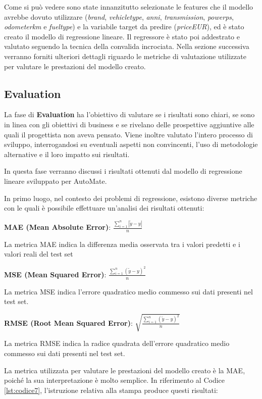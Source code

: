 Come si può vedere sono state innanzitutto selezionate le features che il modello avrebbe dovuto utilizzare (\textit{brand}, \mbox{\textit{vehicle\textunderscore type}}, \textit{anni}, \textit{transmission}, \mbox{\textit{power\textunderscore ps}}, \mbox{\textit{odometer\textunderscore km}} e \textit{fuel\textunderscore type}) e la variabile target da predire \mbox{(\textit{price\textunderscore EUR})}, ed è stato creato il modello di regressione lineare. Il regressore è stato poi addestrato e valutato seguendo la tecnica della convalida incrociata. Nella sezione successiva verranno forniti ulteriori dettagli riguardo le metriche di valutazione utilizzate per valutare le prestazioni del modello creato.
\pagebreak

\subsection{Evaluation}
La fase di \textbf{Evaluation} ha l'obiettivo di valutare se i risultati sono chiari, se sono in linea con gli obiettivi di business e se rivelano delle prospettive aggiuntive alle quali il progettista non aveva pensato. Viene inoltre valutato l'intero processo di sviluppo, interrogandosi su eventuali aspetti non convincenti, l'uso di metodologie alternative e il loro impatto sui risultati.

In questa fase verranno discussi i risultati ottenuti dal modello di regressione lineare sviluppato per AutoMate.

In primo luogo, nel contesto dei problemi di regressione, esistono diverse metriche con le quali è possibile effettuare un'analisi dei risultati ottenuti:
\begin{center}
    \textbf{MAE (Mean Absolute Error)}: $\frac{\sum_{i=1}^{n}|\tilde{y}-y|}{n}$
    
    \medskip
    La metrica MAE indica la differenza media osservata tra i valori 
    predetti e i valori reali del test set

    \medskip
    \textbf{MSE (Mean Squared Error)}: $\frac{\sum_{i=1}^{n}(\tilde{y}-y)^2}{n}$

    \medskip
    La metrica MSE indica l’errore quadratico medio commesso sui dati 
    presenti nel test set.

    \medskip
    \textbf{RMSE (Root Mean Squared Error)}: $\sqrt{\frac{\sum_{i=1}^{n}(\tilde{y}-y)^2}{n}}$

    \medskip
    La metrica RMSE indica la radice quadrata dell’errore quadratico 
    medio commesso sui dati presenti nel test set.

    \medskip
\end{center}
\bigskip
La metrica utilizzata per valutare le prestazioni del modello creato è la MAE, poiché la sua interpretazione è molto semplice.
In riferimento al Codice \ref{lst:codice7}, l'istruzione relativa alla stampa  produce questi risultati:

